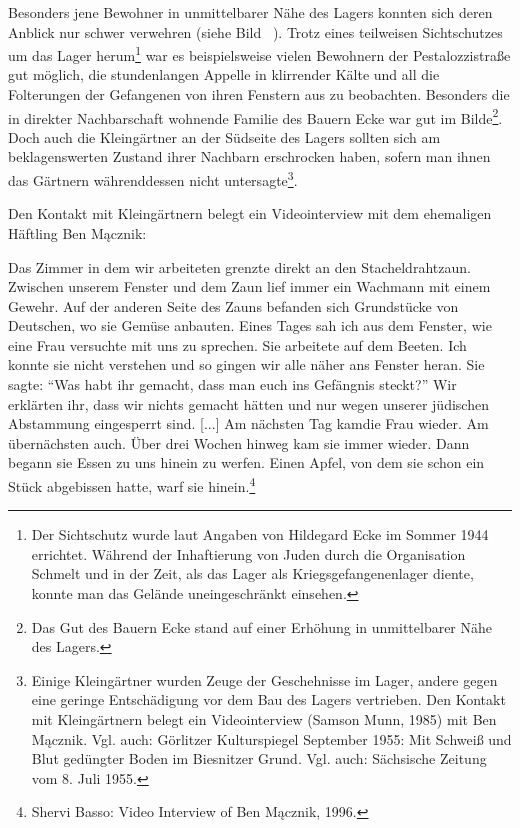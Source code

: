 Besonders jene Bewohner in unmittelbarer Nähe des Lagers konnten sich deren Anblick nur schwer verwehren (siehe Bild ~). Trotz eines teilweisen Sichtschutzes um das Lager herum\footnote{Der Sichtschutz wurde laut Angaben von Hildegard Ecke im Sommer 1944 errichtet. Während der Inhaftierung von Juden durch die Organisation Schmelt und in der Zeit, als das Lager als Kriegsgefangenenlager diente, konnte man das Gelände uneingeschränkt einsehen.} war es beispielsweise vielen Bewohnern der Pestalozzistraße gut möglich, die stundenlangen Appelle in klirrender Kälte und all die Folterungen der Gefangenen von ihren Fenstern aus zu beobachten. Besonders die in direkter Nachbarschaft wohnende Familie des Bauern Ecke war gut im Bilde\footnote{Das Gut des Bauern Ecke stand auf einer Erhöhung in unmittelbarer Nähe des Lagers.}. Doch auch die Kleingärtner an der Südseite des Lagers sollten sich am beklagenswerten Zustand ihrer Nachbarn erschrocken haben, sofern man ihnen das Gärtnern währenddessen nicht untersagte\footnote{Einige Kleingärtner wurden Zeuge der Geschehnisse im Lager, andere gegen eine geringe Entschädigung vor dem Bau des Lagers vertrieben. Den Kontakt mit Kleingärtnern belegt ein Videointerview (Samson Munn, 1985) mit Ben Mącznik. Vgl. auch: Görlitzer Kulturspiegel September 1955: Mit Schweiß und Blut gedüngter Boden im Biesnitzer Grund. Vgl. auch: Sächsische Zeitung vom 8. Juli 1955.}.

Den Kontakt mit Kleingärtnern belegt ein Videointerview mit dem ehemaligen Häftling Ben Mącznik:
\begin{leftbar}
Das Zimmer in dem wir arbeiteten grenzte direkt an den Stacheldrahtzaun. Zwischen unserem Fenster und dem Zaun lief immer ein Wachmann mit einem Gewehr. Auf der anderen Seite des Zauns befanden sich Grundstücke von Deutschen, wo sie Gemüse anbauten.
Eines Tages sah ich aus dem Fenster, wie eine Frau versuchte mit uns zu sprechen. Sie arbeitete auf dem Beeten. Ich konnte sie nicht verstehen
und so gingen wir alle näher ans Fenster heran. Sie sagte: {}``Was habt ihr gemacht, dass man euch ins Gefängnis steckt?'' Wir erklärten ihr, dass wir nichts gemacht hätten und nur wegen unserer jüdischen Abstammung eingesperrt sind. {[}...{]} Am nächsten Tag kam\linebreak\newpage die Frau
wieder. Am übernächsten auch. Über drei Wochen hinweg kam sie immer wieder. Dann begann sie Essen zu uns hinein zu werfen. Einen Apfel, von dem sie schon ein Stück abgebissen hatte, warf sie hinein.\footnote{Shervi Basso: Video Interview of Ben Mącznik, 1996.}
\end{leftbar}

